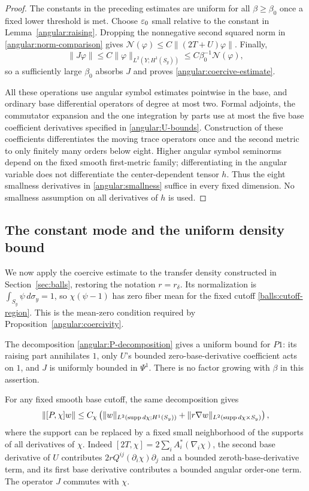 \begin{proof}
The constants in the preceding estimates are uniform for all
$\beta\ge\beta_0$ once a fixed lower threshold is met.  Choose
$\varepsilon_0$ small relative to the constant in
Lemma~\ref{angular:raising}.  Dropping the nonnegative second squared
norm in \eqref{angular:norm-comparison} gives
$\mathcal N(\varphi)\le C\|(2T+U)\varphi\|$.
Finally,
\[
 \|J\varphi\|\le C\|\varphi\|_{L^2(Y;H^1(S_y))}
                         \le C\beta_0^{-1}\mathcal N(\varphi),
\]
so a sufficiently large $\beta_0$ absorbs $J$ and proves
\eqref{angular:coercive-estimate}.

All these operations use angular symbol estimates pointwise in the base,
and ordinary base differential operators of degree at most two.  Formal
adjoints, the commutator expansion and the one integration by parts use
at most the five base coefficient derivatives specified in
\eqref{angular:U-bounds}.  Construction of these coefficients differentiates
the moving trace operators once and the second metric to only finitely
many orders below eight.  Higher angular symbol seminorms depend on the
fixed smooth first-metric family; differentiating in the angular variable
does not differentiate the center-dependent tensor $h$.  Thus the eight
smallness derivatives in \eqref{angular:smallness} suffice in every fixed
dimension.  No smallness assumption on all derivatives of $h$ is used.
\end{proof}

\subsection{The constant mode and the uniform density bound}

We now apply the coercive estimate to the transfer density constructed in
Section~\ref{sec:balls}, restoring the notation $r=r_\delta$.
Its normalization is $\int_{S_y}\psi\,d\sigma_y=1$, so
$\chi(\psi-1)$ has zero fiber mean for the fixed cutoff
\eqref{balls:cutoff-region}.  This is the mean-zero condition required
by Proposition~\ref{angular:coercivity}.

The decomposition \eqref{angular:P-decomposition} gives a uniform
bound for $P1$: its raising part annihilates $1$, only $U$'s bounded
zero-base-derivative coefficient acts on $1$, and $J$ is uniformly
bounded in $\Psi^1$.  There is no factor growing with $\beta$ in this
assertion.

For any fixed smooth base cutoff, the same decomposition gives
\begin{equation}\label{angular:cutoff-bound}
 \|[P,\chi]w\|
 \le C_\chi\left(
  \|w\|_{L^2(\operatorname{supp} d\chi;H^1(S_y))}
    +\|r\nabla w\|_{L^2(\operatorname{supp} d\chi\times S_y)}\right),
\end{equation}
where the support can be replaced by a fixed small neighborhood of the
supports of all derivatives of $\chi$.
Indeed $[2T,\chi]=2\sum_iA_i^*(\nabla_i\chi)$, the second base derivative
of $U$ contributes $2rQ^{ij}(\partial_i\chi)\partial_j$ and a bounded
zeroth-base-derivative term, and its first base derivative contributes a
bounded angular order-one term.  The operator $J$ commutes with $\chi$.

